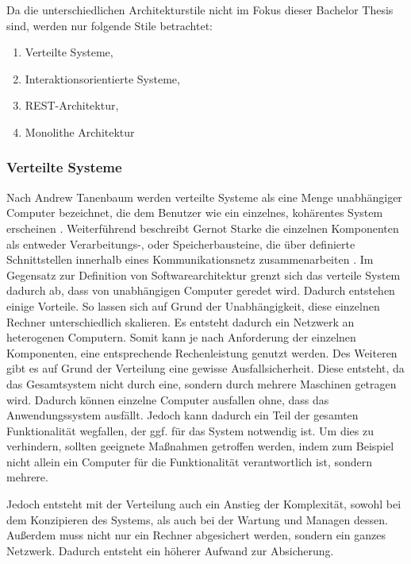Da die unterschiedlichen Architekturstile nicht im  Fokus dieser Bachelor Thesis sind, werden nur folgende Stile betrachtet:

\begin{enumerate}
	\item Verteilte Systeme,
	\item Interaktionsorientierte Systeme,
	\item REST-Architektur,
	\item Monolithe Architektur
\end{enumerate}

\subsubsection{Verteilte Systeme}

Nach Andrew Tanenbaum werden verteilte Systeme als eine Menge unabhängiger Computer bezeichnet, die dem Benutzer wie ein einzelnes, kohärentes System erscheinen \parencite{tanenbaum_verteilte_2007}. Weiterführend beschreibt Gernot Starke die einzelnen Komponenten als entweder Verarbeitungs-, oder Speicherbausteine, die über definierte Schnittstellen innerhalb eines Kommunikationsnetz zusammenarbeiten \parencite[vlg.][S. 116]{starke_effektive_2015}. Im Gegensatz zur Definition von Softwarearchitektur grenzt sich das verteile System dadurch ab, dass von unabhängigen Computer geredet wird. Dadurch entstehen einige Vorteile. So lassen sich auf Grund der Unabhängigkeit, diese einzelnen Rechner unterschiedlich skalieren. Es entsteht dadurch ein Netzwerk an heterogenen Computern. Somit kann je nach Anforderung der einzelnen Komponenten, eine entsprechende Rechenleistung genutzt werden. Des Weiteren gibt es auf Grund der Verteilung eine gewisse Ausfallsicherheit. Diese entsteht, da das Gesamtsystem nicht durch eine, sondern durch mehrere Maschinen getragen wird. Dadurch können einzelne Computer ausfallen ohne, dass das Anwendungssystem ausfällt. Jedoch kann dadurch ein Teil der gesamten Funktionalität wegfallen, der ggf. für das System notwendig ist. Um dies zu verhindern, sollten geeignete Maßnahmen getroffen werden, indem zum Beispiel nicht allein ein Computer für die Funktionalität verantwortlich ist, sondern mehrere.

Jedoch entsteht mit der Verteilung auch ein Anstieg der Komplexität, sowohl bei dem Konzipieren des Systems, als auch bei der Wartung und Managen dessen. Außerdem muss nicht nur ein Rechner abgesichert werden, sondern ein ganzes Netzwerk. Dadurch entsteht ein höherer Aufwand zur Absicherung.

